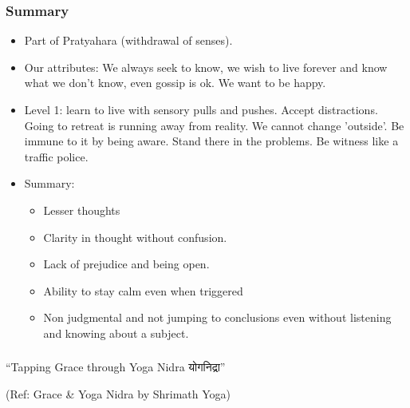 \begin{frame}[fragile]\frametitle{Summary}
		\begin{itemize}
		\item Part of Pratyahara (withdrawal of senses).
		\item Our attributes: We always seek to know, we wish to live forever and know what we don't know, even gossip is ok. We want to be happy.
		\item Level 1: learn to live with sensory pulls and pushes. Accept distractions. Going to retreat is running away from reality. We cannot change 'outside'. Be immune to it by being aware. Stand there in the problems. Be witness like a traffic police.
		\item Summary:
			\begin{itemize}
			\item Lesser thoughts
			\item Clarity in thought without confusion.
			\item Lack of prejudice and being open.
			\item Ability to stay calm even when triggered 
			\item Non judgmental and not jumping to conclusions even without listening and knowing about a subject.
			\end{itemize}
		\end{itemize}
\end{frame}


\begin{frame}[fragile]\frametitle{}
\begin{center}
{\Large ``Tapping Grace through Yoga Nidra योगनिद्रा'' }
\end{center}

{\tiny (Ref:  Grace \& Yoga Nidra by Shrimath Yoga)}

\end{frame}


